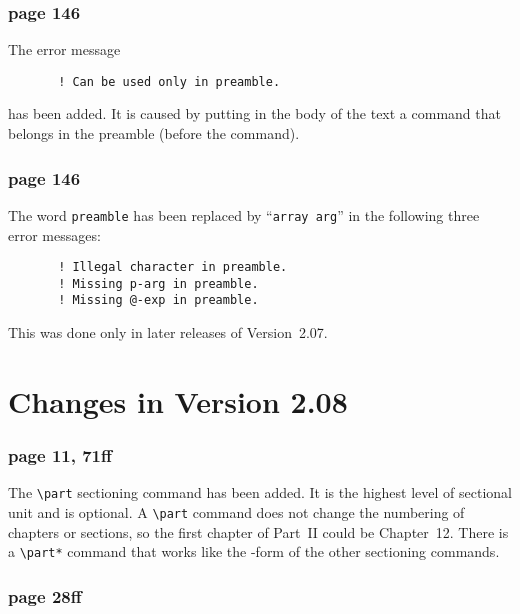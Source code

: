 \subsubsection*{page 146}
The error message 
\begin{verbatim}
       ! Can be used only in preamble.
\end{verbatim}
has been added.  It is caused by putting in the body of the text a
command that belongs in the preamble (before the
\hbox{\verb""} command).

\subsubsection*{page 146}
The word \hbox{\tt preamble} has been replaced by 
``\hbox{\tt array arg}'' in the following three error messages:
\begin{verbatim}
       ! Illegal character in preamble.
       ! Missing p-arg in preamble.
       ! Missing @-exp in preamble.
\end{verbatim}
This was done only in later releases of Version~2.07. 

\section*{Changes in Version 2.08}


\subsubsection*{page 11, 71ff}

The \verb|\part| sectioning command has been added.  It is the highest
level of sectional unit and is optional.  A \verb|\part| command
does not change the numbering of chapters or sections, so the first
chapter of Part~II could be Chapter~12.  There is a \verb|\part*|
command that works like the {\tt *}-form of the other sectioning
commands.

\subsubsection*{page 28ff}

